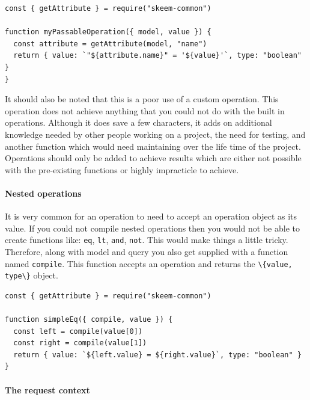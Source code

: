 \documentclass[
  12pt,
]{article}
\newcommand{\passthrough}[1]{#1}
\let\oldparagraph\paragraph
\renewcommand{\paragraph}[1]{\oldparagraph{#1}\mbox{}}
\begin{document}
\begin{lstlisting}[caption={Checks to see if the attribute actually exists and returns the correct type}]
const { getAttribute } = require("skeem-common")

function myPassableOperation({ model, value }) {
  const attribute = getAttribute(model, "name")
  return { value: `"${attribute.name}" = '${value}'`, type: "boolean" }
}
\end{lstlisting}

It should also be noted that this is a poor use of a custom operation.
This operation does not achieve anything that you could not do with the
built in operations. Although it does save a few characters, it adds on
additional knowledge needed by other people working on a project, the
need for testing, and another function which would need maintaining over
the life time of the project. Operations should only be added to achieve
results which are either not possible with the pre-existing functions or
highly impracticle to achieve.

\hypertarget{nested-operations}{%
\paragraph{Nested operations}\label{nested-operations}}

It is very common for an operation to need to accept an operation object
as its value. If you could not compile nested operations then you would
not be able to create functions like: \passthrough{\lstinline!eq!},
\passthrough{\lstinline!lt!}, \passthrough{\lstinline!and!},
\passthrough{\lstinline!not!}. This would make things a little tricky.
Therefore, along with model and query you also get supplied with a
function named \passthrough{\lstinline!compile!}. This function accepts
an operation and returns the \passthrough{\lstinline!\{value, type\}!}
object.

\begin{lstlisting}[caption={A simple implementation of the eq operaion.}]
const { getAttribute } = require("skeem-common")

function simpleEq({ compile, value }) {
  const left = compile(value[0])
  const right = compile(value[1])
  return { value: `${left.value} = ${right.value}`, type: "boolean" }
}
\end{lstlisting}

\hypertarget{the-request-context}{%
\paragraph{The request context}\label{the-request-context}}
\end{document}
